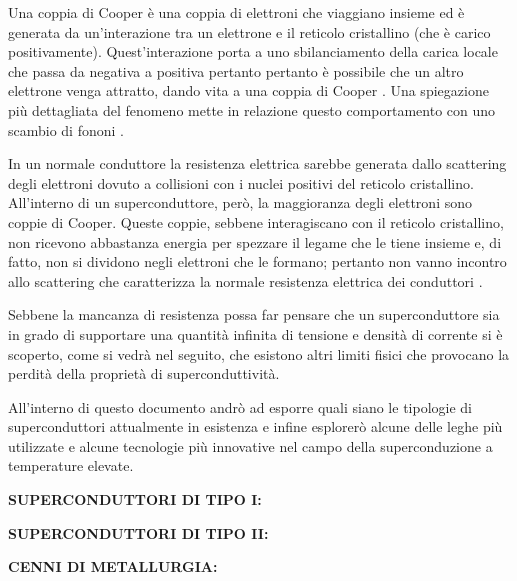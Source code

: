 \documentclass[a4paper,10pt]{article}
\begin{document}
Una coppia di Cooper è una coppia di elettroni che viaggiano insieme ed è generata da
un'interazione tra un elettrone e il reticolo cristallino (che è carico positivamente).
Quest'interazione porta a uno sbilanciamento della carica locale che passa da negativa a positiva
pertanto pertanto è possibile che un altro elettrone venga attratto, dando vita a una coppia di
Cooper \cite{cooper-cambridge}. Una spiegazione più dettagliata del fenomeno mette in relazione
questo comportamento con uno scambio di fononi \cite{quantum-springer}.

In un normale conduttore la resistenza elettrica sarebbe generata dallo scattering degli elettroni
dovuto a collisioni con i nuclei positivi del reticolo cristallino. All'interno di un
superconduttore, però, la maggioranza degli elettroni sono coppie di Cooper. Queste coppie, sebbene
interagiscano con il reticolo cristallino, non ricevono abbastanza energia per spezzare il legame
che le tiene insieme e, di fatto, non si dividono negli elettroni che le formano; pertanto non
vanno incontro allo scattering che caratterizza la normale resistenza elettrica dei conduttori
\cite{bcs-cambridge}.

Sebbene la mancanza di resistenza possa far pensare che un superconduttore sia in grado di
supportare una quantità infinita di tensione e densità di corrente si è scoperto, come si vedrà nel
seguito, che esistono altri limiti fisici che provocano la perdità della proprietà di
superconduttività.

All'interno di questo documento andrò ad esporre quali siano le tipologie di superconduttori
attualmente in esistenza e infine esplorerò alcune delle leghe più utilizzate e alcune tecnologie
più innovative nel campo della superconduzione a temperature elevate.

\bigskip
{}
\makeatletter{}\makeatother
\label{sec:quench}
\noindent
\textbf{SUPERCONDUTTORI DI TIPO I:}

\bigskip
{}
\makeatletter{}\makeatother
\label{sec:mariotto}
\noindent
\textbf{SUPERCONDUTTORI DI TIPO II:}

\bigskip
{}
\makeatletter{}\makeatother
\label{sec:mariotto}
\noindent
\textbf{CENNI DI METALLURGIA:}



\clearpage
\end{document}
